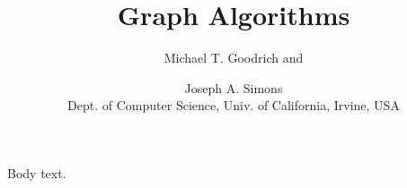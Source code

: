 \documentclass[letter,11pt]{journal}
\title{Graph Algorithms}
\author
{
Michael T. Goodrich
\ifFull
and
\else
\and
\fi
Joseph A. Simons
\ifFull\\
Dept. of Computer Science, Univ. of California, Irvine, USA
\fi
}
\begin{document}
\maketitle
Body text.
\end{document}
